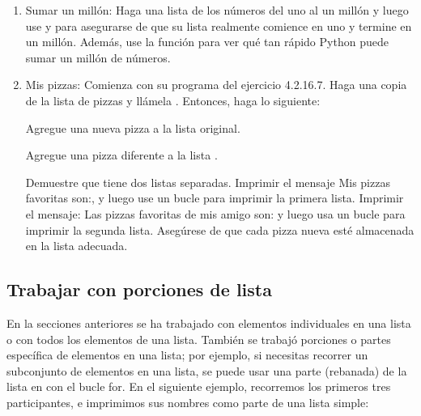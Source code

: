 \begin{enumerate}[4.2.16.1]
	Agregue una línea al final de su programa, fuera del bucle {}, que indique cuánto te gusta la pizza.
	La salida debe tener tres o más líneas, sobre los tipos de pizza que te gustan y luego una oración adicional, como ¡Realmente amo la pizza!
	
	\item Sumar un millón: Haga una lista de los números del uno al un millón y
	luego use {} y {} para asegurarse de que su lista realmente comience en uno y termine
	en un millón. 
	Además, use la función {} para ver qué tan rápido Python puede sumar un millón de números.
	
	
	\item  Mis pizzas: Comienza con su programa del ejercicio 4.2.16.7. Haga una copia de la lista de pizzas y llámela {}. Entonces, haga lo siguiente:
	
	Agregue una nueva pizza a la lista original.
	
	Agregue una pizza diferente a la lista {}.
	
	Demuestre que tiene dos listas separadas. Imprimir el mensaje Mis pizzas favoritas 	son:, y luego use un bucle {} para imprimir la primera lista. Imprimir el mensaje: Las pizzas favoritas de mis amigo son: y luego usa un bucle {} para imprimir la segunda lista. 	Asegúrese de que cada pizza nueva esté almacenada en la lista adecuada.
	
\end{enumerate}




\subsection{Trabajar con porciones de lista}

En la secciones anteriores se ha trabajado con elementos individuales en una lista o con todos los elementos de una lista.
También se trabajó porciones o partes específica de elementos en una lista; por ejemplo, si necesitas recorrer un subconjunto de elementos en una lista, se puede usar una parte (rebanada) de la lista en con el bucle {\ttfamily for}. En el siguiente ejemplo, recorremos los primeros tres participantes, e imprimimos sus nombres como parte de una lista simple:


